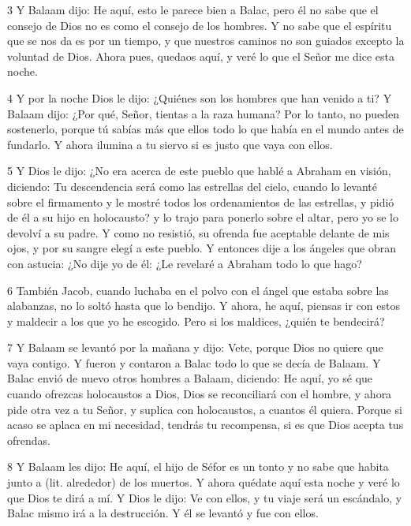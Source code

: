 \par 3 Y Balaam dijo: He aquí, esto le parece bien a Balac, pero él no sabe que el consejo de Dios no es como el consejo de los hombres. Y no sabe que el espíritu que se nos da es por un tiempo, y que nuestros caminos no son guiados excepto la voluntad de Dios. Ahora pues, quedaos aquí, y veré lo que el Señor me dice esta noche.

\par 4 Y por la noche Dios le dijo: ¿Quiénes son los hombres que han venido a ti? Y Balaam dijo: ¿Por qué, Señor, tientas a la raza humana? Por lo tanto, no pueden sostenerlo, porque tú sabías más que ellos todo lo que había en el mundo antes de fundarlo. Y ahora ilumina a tu siervo si es justo que vaya con ellos.

\par 5 Y Dios le dijo: ¿No era acerca de este pueblo que hablé a Abraham en visión, diciendo: Tu descendencia será como las estrellas del cielo, cuando lo levanté sobre el firmamento y le mostré todos los ordenamientos de las estrellas, y pidió de él a su hijo en holocausto? y lo trajo para ponerlo sobre el altar, pero yo se lo devolví a su padre. Y como no resistió, su ofrenda fue aceptable delante de mis ojos, y por su sangre elegí a este pueblo. Y entonces dije a los ángeles que obran con astucia: ¿No dije yo de él: ¿Le revelaré a Abraham todo lo que hago?

\par 6 También Jacob, cuando luchaba en el polvo con el ángel que estaba sobre las alabanzas, no lo soltó hasta que lo bendijo. Y ahora, he aquí, piensas ir con estos y maldecir a los que yo he escogido. Pero si los maldices, ¿quién te bendecirá?

\par 7 Y Balaam se levantó por la mañana y dijo: Vete, porque Dios no quiere que vaya contigo. Y fueron y contaron a Balac todo lo que se decía de Balaam. Y Balac envió de nuevo otros hombres a Balaam, diciendo: He aquí, yo sé que cuando ofrezcas holocaustos a Dios, Dios se reconciliará con el hombre, y ahora pide otra vez a tu Señor, y suplica con holocaustos, a cuantos él quiera. Porque si acaso se aplaca en mi necesidad, tendrás tu recompensa, si es que Dios acepta tus ofrendas.

\par 8 Y Balaam les dijo: He aquí, el hijo de Séfor es un tonto y no sabe que habita junto a (lit. alrededor) de los muertos. Y ahora quédate aquí esta noche y veré lo que Dios te dirá a mí. Y Dios le dijo: Ve con ellos, y tu viaje será un escándalo, y Balac mismo irá a la destrucción. Y él se levantó y fue con ellos.

